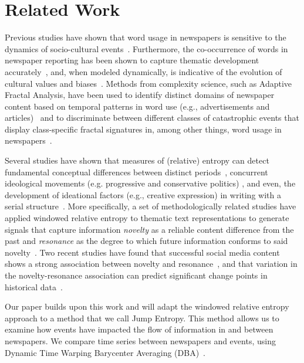 \documentclass[]{ceurart}
\begin{document}
\section{Related Work}
Previous studies have shown that word usage in newspapers is sensitive to the dynamics of socio-cultural events~\cite{guldi_measures_2019, van_eijnatten_eurocentric_2019, daems_workers_2019}. Furthermore, the co-occurrence of words in newspaper reporting has been shown to capture thematic development accurately~\cite{newman_probabilistic_2006}, and, when modeled dynamically, is indicative of the evolution of cultural values and biases~\cite{van_eijnatten_eurocentric_2019, paul2019bursty, wevers_using_2019}. Methods from complexity science, such as Adaptive Fractal Analysis, have been used to identify distinct domains of newspaper content based on temporal patterns in word use (e.g., advertisements and articles)~\cite{wevers_tracking_2020} and to discriminate between different classes of catastrophic events that display class-specific fractal signatures in, among other things, word usage in newspapers~\cite{gao_culturomics_2012}. 

Several studies have shown that measures of (relative) entropy can detect fundamental conceptual differences between distinct periods~\cite{guldi_measures_2019, degaetano-ortliebUsingRelativeEntropy2018, kestemont_mining_2014}, concurrent ideological movements (e.g. progressive and conservative politics) \cite{barron_individuals_2018, bos_quantifying_2016}, and even, the development of ideational factors (e.g., creative expression) in writing with a serial structure~\cite{murdock_exploration_2015, nielbo_automated_2019, nielbo_curious_2019}. More specifically, a set of methodologically related studies have applied windowed relative entropy to thematic text representations to generate signals that capture information \emph{novelty} as a reliable content difference from the past and \emph{resonance} as the degree to which future information conforms to said novelty~\cite{barron_individuals_2018, murdock_exploration_2015}. Two recent studies have found that successful social media content shows a strong association between novelty and resonance~\cite{nielbo_trend_2021}, and that variation in the novelty-resonance association can predict significant change points in historical data~\cite{vrangbaek_composition_2021}. 

Our paper builds upon this work and will adapt the windowed relative entropy approach to a method that we call Jump Entropy. This method allows us to examine how events have impacted the flow of information in and between newspapers. We compare time series between newspapers and events, using Dynamic Time Warping Barycenter Averaging (DBA)~\cite{petitjean2011global}.
\end{document}
